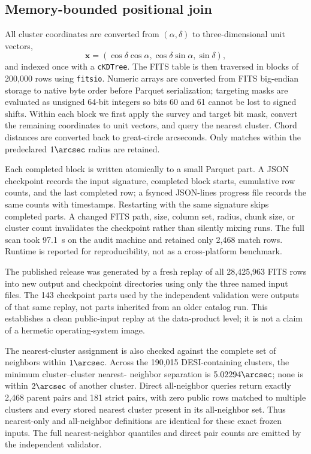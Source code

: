 \documentclass[twocolumn]{aastex701}
\begin{document}
\subsection{Memory-bounded positional join}\label{sec:join}

All cluster coordinates are converted from $(\alpha,\delta)$ to three-dimensional unit vectors,
\begin{equation}
\boldsymbol{x}=(\cos\delta\cos\alpha,\cos\delta\sin\alpha,\sin\delta),
\end{equation}
and indexed once with a \texttt{cKDTree}.  The FITS table is then traversed in blocks of 200,000
rows using \texttt{fitsio}.  Numeric arrays are converted from FITS big-endian storage to native
byte order before Parquet serialization; targeting masks are evaluated as unsigned 64-bit
integers so bits 60 and 61 cannot be lost to signed shifts.  Within each block we first apply the survey and target
bit mask, convert the remaining coordinates to unit vectors, and query the nearest cluster.
Chord distances are converted back to great-circle arcseconds.  Only matches within the
predeclared $1\arcsec$ radius are retained.

Each completed block is written atomically to a small Parquet part.  A JSON checkpoint records
the input signature, completed block starts, cumulative row counts, and the last completed row;
a fsynced JSON-lines progress file records the same counts with timestamps.  Restarting with the
same signature skips completed parts.  A changed FITS path, size, column set, radius, chunk size,
or cluster count invalidates the checkpoint rather than silently mixing runs.  The full scan took
97.1~s on the audit machine and retained only 2,468 match rows.  Runtime is reported for
reproducibility, not as a cross-platform benchmark.

The published release was generated by a fresh replay of all 28,425,963 FITS rows into new output
and checkpoint directories using only the three named input files.  The 143 checkpoint parts used
by the independent validation were outputs of that same replay, not parts inherited from an older
catalog run.  This establishes a clean public-input replay at the data-product level; it is not a
claim of a hermetic operating-system image.

The nearest-cluster assignment is also checked against the complete set of neighbors within
$1\arcsec$.  Across the 190,015 DESI-containing clusters, the minimum cluster--cluster nearest-
neighbor separation is $5.02294\arcsec$; none is within $2\arcsec$ of another cluster.  Direct
all-neighbor queries return exactly 2,468 parent pairs and 181 strict pairs, with zero public rows
matched to multiple clusters and every stored nearest cluster present in its all-neighbor set.
Thus nearest-only and all-neighbor definitions are identical for these exact frozen inputs.  The
full nearest-neighbor quantiles and direct pair counts are emitted by the independent validator.
\end{document}
